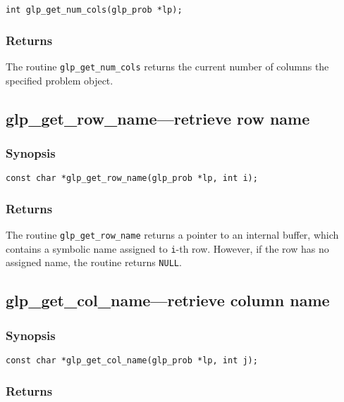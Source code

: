 \begin{verbatim}
int glp_get_num_cols(glp_prob *lp);
\end{verbatim}

\subsubsection*{Returns}

The routine \verb|glp_get_num_cols| returns the current number of
columns the specified problem object.

\subsection{glp\_get\_row\_name---retrieve row name}

\subsubsection*{Synopsis}

\begin{verbatim}
const char *glp_get_row_name(glp_prob *lp, int i);
\end{verbatim}

\subsubsection*{Returns}

The routine \verb|glp_get_row_name| returns a pointer to an internal
buffer, which contains a symbolic name assigned to \verb|i|-th row.
However, if the row has no assigned name, the routine returns
\verb|NULL|.

\subsection{glp\_get\_col\_name---retrieve column name}

\subsubsection*{Synopsis}

\begin{verbatim}
const char *glp_get_col_name(glp_prob *lp, int j);
\end{verbatim}

\subsubsection*{Returns}

